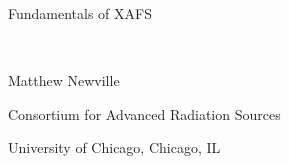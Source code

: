 \newcommand{\mytitle}{Fundamentals of XAFS}

 \newcommand{\myauthor}{Matthew Newville}

\begin{flushright}\vspace*{0.375in}

 \vspace{10mm}

\ThickGreyLine{}

\vspace{5mm} {\huge \mytitle{}

 \vspace{100mm}} \ {}\end{flushright}

\begin{flushright}\thispagestyle{empty}

 \setcounter{page}{0}\end{flushright}

\begin{flushright}{\large \myauthor{}

\par
  }Consortium for Advanced Radiation Sources\par
  University of Chicago, Chicago, IL\par
  
\end{flushright}

\begin{flushright}\thispagestyle{empty}

 \vspace{5mm} \ThickGreyLine{}\end{flushright}

\begin{flushright}\update{}

\par
\end{flushright}


\clearpage  
\setcounter{page}{1} 
\tableofcontents   
\clearpage   

